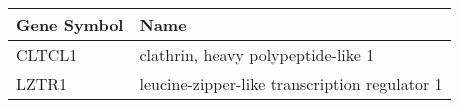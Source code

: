 \begin{tabular}{ll}
\toprule
Gene Symbol &                                          Name \\
\midrule
     CLTCL1 &            clathrin, heavy polypeptide-like 1 \\
      LZTR1 & leucine-zipper-like transcription regulator 1 \\
\bottomrule
\end{tabular}
